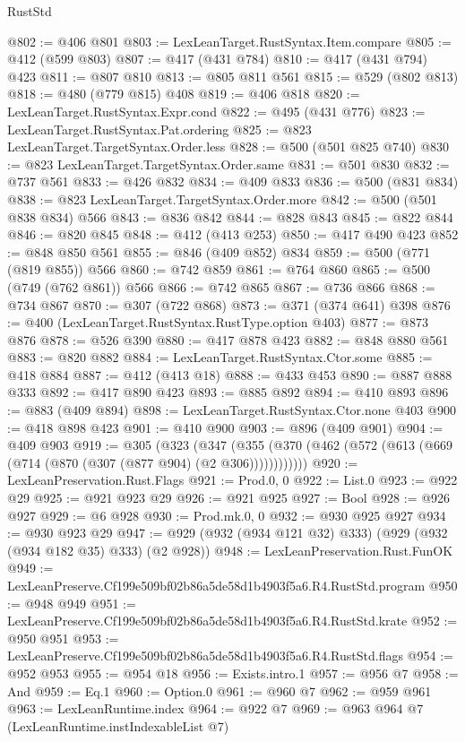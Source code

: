 \begin{lexlean}{RustStd}
\begin{coremodule}
@802 := @406 @801
@803 := LexLeanTarget.RustSyntax.Item.compare
@805 := @412 (@599 @803)
@807 := @417 (@431 @784)
@810 := @417 (@431 @794) @423
@811 := @807 @810
@813 := @805 @811 @561
@815 := @529 (@802 @813)
@818 := @480 (@779 @815) @408
@819 := @406 @818
@820 := LexLeanTarget.RustSyntax.Expr.cond
@822 := @495 (@431 @776)
@823 := LexLeanTarget.RustSyntax.Pat.ordering
@825 := @823 LexLeanTarget.TargetSyntax.Order.less
@828 := @500 (@501 @825 @740)
@830 := @823 LexLeanTarget.TargetSyntax.Order.same
@831 := @501 @830
@832 := @737 @561
@833 := @426 @832
@834 := @409 @833
@836 := @500 (@831 @834)
@838 := @823 LexLeanTarget.TargetSyntax.Order.more
@842 := @500 (@501 @838 @834) @566
@843 := @836 @842
@844 := @828 @843
@845 := @822 @844
@846 := @820 @845
@848 := @412 (@413 @253)
@850 := @417 @490 @423
@852 := @848 @850 @561
@855 := @846 (@409 @852) @834
@859 := @500 (@771 (@819 @855)) @566
@860 := @742 @859
@861 := @764 @860
@865 := @500 (@749 (@762 @861)) @566
@866 := @742 @865
@867 := @736 @866
@868 := @734 @867
@870 := @307 (@722 @868)
@873 := @371 (@374 @641) @398
@876 := @400 (LexLeanTarget.RustSyntax.RustType.option @403)
@877 := @873 @876
@878 := @526 @390
@880 := @417 @878 @423
@882 := @848 @880 @561
@883 := @820 @882
@884 := LexLeanTarget.RustSyntax.Ctor.some
@885 := @418 @884
@887 := @412 (@413 @18)
@888 := @433 @453
@890 := @887 @888 @333
@892 := @417 @890 @423
@893 := @885 @892
@894 := @410 @893
@896 := @883 (@409 @894)
@898 := LexLeanTarget.RustSyntax.Ctor.none @403
@900 := @418 @898 @423
@901 := @410 @900
@903 := @896 (@409 @901)
@904 := @409 @903
@919 := @305
    (@323
      (@347 (@355 (@370 (@462 (@572 (@613 (@669 (@714 (@870 (@307 (@877 @904) (@2 @306))))))))))))
@920 := LexLeanPreservation.Rust.Flags
@921 := Prod.{0, 0}
@922 := List.{0}
@923 := @922 @29
@925 := @921 @923 @29
@926 := @921 @925
@927 := Bool
@928 := @926 @927
@929 := @6 @928
@930 := Prod.mk.{0, 0}
@932 := @930 @925 @927
@934 := @930 @923 @29
@947 := @929 (@932 (@934 @121 @32) @333) (@929 (@932 (@934 @182 @35) @333) (@2 @928))
@948 := LexLeanPreservation.Rust.FunOK
@949 := LexLeanPreserve.Cf199e509bf02b86a5de58d1b4903f5a6.R4.RustStd.program
@950 := @948 @949
@951 := LexLeanPreserve.Cf199e509bf02b86a5de58d1b4903f5a6.R4.RustStd.krate
@952 := @950 @951
@953 := LexLeanPreserve.Cf199e509bf02b86a5de58d1b4903f5a6.R4.RustStd.flags
@954 := @952 @953
@955 := @954 @18
@956 := Exists.intro.{1}
@957 := @956 @7
@958 := And
@959 := Eq.{1}
@960 := Option.{0}
@961 := @960 @7
@962 := @959 @961
@963 := LexLeanRuntime.index
@964 := @922 @7
@969 := @963 @964 @7 (LexLeanRuntime.instIndexableList @7)

\end{coremodule}
\end{lexlean}
